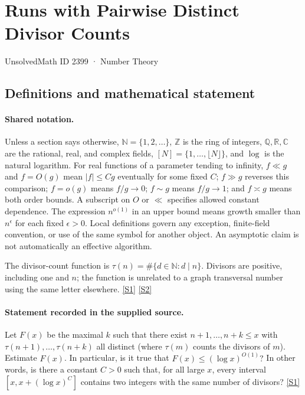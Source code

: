 \documentclass[11pt,a4paper]{article}
\newcommand{\N}{\mathbb{N}}
\newcommand{\Z}{\mathbb{Z}}
\newcommand{\Q}{\mathbb{Q}}
\newcommand{\R}{\mathbb{R}}
\newcommand{\C}{\mathbb{C}}
\newcommand{\sref}[2]{\hyperlink{source:#1:#2}{[S#2]}}
\begin{document}

\setcounter{section}{2398}

\section{Runs with Pairwise Distinct Divisor Counts}\label{2399}

{\small\sffamily UnsolvedMath ID 2399 · Number Theory}

\subsection{Definitions and mathematical statement}

\paragraph{Shared notation.}Unless a section says otherwise, $\N=\{1,2,\ldots\}$,
$\Z$ is the ring of integers, $\Q,\R,\C$ are the rational, real, and complex
fields, $[N]=\{1,\ldots,\lfloor N\rfloor\}$, and $\log$ is the natural
logarithm. For real functions of a parameter tending to infinity,
$f\ll g$ and $f=O(g)$ mean $|f|\leq Cg$ eventually for some fixed $C$;
$f\gg g$ reverses this comparison; $f=o(g)$ means $f/g\to0$;
$f\sim g$ means $f/g\to1$; and $f\asymp g$ means both order bounds.
A subscript on $O$ or $\ll$ specifies allowed constant dependence.
The expression $n^{o(1)}$ in an upper bound means growth smaller than
$n^\epsilon$ for each fixed $\epsilon>0$. Local definitions govern any
exception, finite-field convention, or use of the same symbol for another
object. An asymptotic claim is not automatically an effective algorithm.



The divisor-count function is $\tau(n)=\#\{d\in\N:d\mid n\}$. Divisors are positive, including one and $n$; the function is unrelated to a graph transversal number using the same letter elsewhere. \sref{2399}{1} \sref{2399}{2}

\paragraph{Statement recorded in the supplied source.}
Let $F(x)$ be the maximal $k$ such that there exist $n+1,\ldots,n+k\leq x$ with $\tau(n+1),\ldots,\tau(n+k)$ all distinct (where $\tau(m)$ counts the divisors of $m$). Estimate $F(x)$. In particular, is it true that $ F(x) \leq (\log x)^{O(1)}? $ In other words, is there a constant $C>0$ such that, for all large $x$, every interval $[x,x+(\log x)^C]$ contains two integers with the same number of divisors? \sref{2399}{1}
\end{document}
